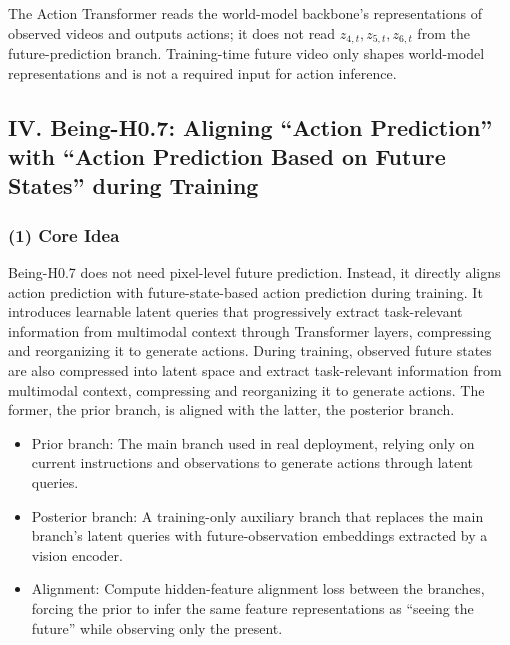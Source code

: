 The Action Transformer reads the world-model backbone's representations of observed videos and outputs actions; it does not read \(z_{4,t},z_{5,t},z_{6,t}\) from the future-prediction branch. Training-time future video only shapes world-model representations and is not a required input for action inference.

\hypertarget{iv.-being-h0.7-aligning-action-prediction-with-action-prediction-based-on-future-states-during-training}{%
\subsection{IV. Being-H0.7: Aligning ``Action Prediction'' with ``Action Prediction Based on Future States'' during Training}\label{iv.-being-h0.7-aligning-action-prediction-with-action-prediction-based-on-future-states-during-training}}

\hypertarget{core-idea-8}{%
\subsubsection{(1) Core Idea}\label{core-idea-8}}

Being-H0.7 does not need pixel-level future prediction. Instead, it directly aligns action prediction with future-state-based action prediction during training. It introduces learnable latent queries that progressively extract task-relevant information from multimodal context through Transformer layers, compressing and reorganizing it to generate actions. During training, observed future states are also compressed into latent space and extract task-relevant information from multimodal context, compressing and reorganizing it to generate actions. The former, the prior branch, is aligned with the latter, the posterior branch.

\begin{itemize}
\tightlist
\item
  Prior branch: The main branch used in real deployment, relying only on current instructions and observations to generate actions through latent queries.
\item
  Posterior branch: A training-only auxiliary branch that replaces the main branch's latent queries with future-observation embeddings extracted by a vision encoder.
\item
  Alignment: Compute hidden-feature alignment loss between the branches, forcing the prior to infer the same feature representations as ``seeing the future'' while observing only the present.
\end{itemize}

